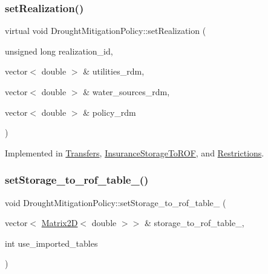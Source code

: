 \mbox{\label{classDroughtMitigationPolicy_a5d2033543cacca1e412eebef5106eab4_a5d2033543cacca1e412eebef5106eab4}} 
\subsubsection{\texorpdfstring{set\+Realization()}{setRealization()}}
{\footnotesize\ttfamily virtual void Drought\+Mitigation\+Policy\+::set\+Realization (\begin{DoxyParamCaption}\item[{unsigned long}]{realization\+\_\+id,  }\item[{vector$<$ double $>$ \&}]{utilities\+\_\+rdm,  }\item[{vector$<$ double $>$ \&}]{water\+\_\+sources\+\_\+rdm,  }\item[{vector$<$ double $>$ \&}]{policy\+\_\+rdm }\end{DoxyParamCaption})\hspace{0.3cm}{\ttfamily [pure virtual]}}



Implemented in \mbox{\hyperlink{classTransfers_a75342a7c14b2ff69eb2520de240a1131_a75342a7c14b2ff69eb2520de240a1131}{Transfers}}, \mbox{\hyperlink{classInsuranceStorageToROF_a6318c3dca8b0c4d568eac494e5ccf712_a6318c3dca8b0c4d568eac494e5ccf712}{Insurance\+Storage\+To\+R\+OF}}, and \mbox{\hyperlink{classRestrictions_abc17a8a403311933a3bb58fbecd5f5fd_abc17a8a403311933a3bb58fbecd5f5fd}{Restrictions}}.

\mbox{\label{classDroughtMitigationPolicy_a75710a6ab73213223222b3472f9251c0_a75710a6ab73213223222b3472f9251c0}} 
\subsubsection{\texorpdfstring{set\+Storage\+\_\+to\+\_\+rof\+\_\+table\+\_\+()}{setStorage\_to\_rof\_table\_()}}
{\footnotesize\ttfamily void Drought\+Mitigation\+Policy\+::set\+Storage\+\_\+to\+\_\+rof\+\_\+table\+\_\+ (\begin{DoxyParamCaption}\item[{vector$<$ \mbox{\hyperlink{classMatrix2D}{Matrix2D}}$<$ double $>$$>$ \&}]{storage\+\_\+to\+\_\+rof\+\_\+table\+\_\+,  }\item[{int}]{use\+\_\+imported\+\_\+tables }\end{DoxyParamCaption})}



